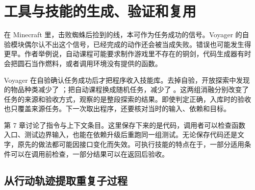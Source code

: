 \chapter{工具与技能的生成、验证和复用}
\label{ch08}


\begin{failurebox}
在 Minecraft 里，击败蜘蛛后捡到的线，本可作为任务成功的信号。Voyager 的自验模块偶尔认不出这个信号，已经完成的动作还会被当成失败。错误也可能发生得更早。作者举例说，自动课程可能要求制作游戏里不存在的铜剑，代码生成器有时会把圆石当作燃料，或者调用环境没有提供的函数\cite{voyager-2305}。

Voyager 在自验确认任务成功后才把程序收入技能库。去掉自验，开放探索中发现的物品种类减少了 ；把自动课程换成随机任务，减少了 \cite{voyager-2305}。这两组消融分别改变了任务的来源和验收方式，观察的是整段探索的结果。即使判定正确，入库时的验收也只覆盖来源任务。下一次取出程序，还要核对当时的输入、依赖和目标。
\end{failurebox}


第 7 章讨论了指令与上下文条目。这里保存下来的是代码，调用者可以检查函数入口、测试边界输入，也能在依赖升级后重跑同一组测试。无论保存代码还是文字，原先的做法都可能因接口变化而失效。可执行技能的特点在于，一部分适用条件可以在调用前检查，一部分结果可以在返回后验收。

\section{从行动轨迹提取重复子过程}
\label{sec:ch08-extract}

